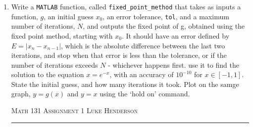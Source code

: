 \documentclass[12pt]{amsart}
\begin{document}
\begin{enumerate}
\begin{enumerate}
\begin{enumerate}
        \item\begin{multicols}{2}
            
        \columnbreak
            
        \end{multicols}
        The number computed with the Python solver is approximately 0.43857, whereas the one computed with the bisection method is approximately 0.43856. I am not sure precisely which of the \href{https://docs.scipy.org/doc/scipy/reference/generated/scipy.optimize.root_scalar.html}{available solvers} in SciPy is used by default, but it is likely not the bisection method and instead a method that converges faster. That combined with the fact that there is no maximum iteration number by default means that the SciPy answer is likely closer to the answer. The fact that they vary by about $10^{-5}$ supports the idea that the early termination in \texttt{bisection\_method} contributes to the discrepancy, since that is the least upper bound for absolute error bound that was chosen.
    \end{enumerate}
\end{enumerate}
\bigskip

\item Write a \texttt{MATLAB} function, called \texttt{fixed\_point\_method} that takes as inputs a function, $g$, an initial guess $x_0$, an error tolerance, \texttt{tol}, and a maximum number of iterations, $N$, and outputs the fixed point of g, obtained using the fixed point method, starting with $x_0$. It should have an error defined by $E = |x_n - x_{n-1}|$, which is the absolute difference between the last two iterations, and stop when that error is less than the tolerance, or if the number of iterations exceeds $N$ - whichever happens first. use it to find the solution to the equation $x = e^{-x}$, with an accuracy of $10^{-10}$ for $x \in [-1, 1]$. State the initial guess, and how many iterations it took. Plot on the samge graph, $y = g(x)$ and $y = x$ using the `hold on' command.

\newpage
{\scshape Math 131} \hfill {\scshape \large Assignment 1} \hfill {\scshape Luke Henderson}
\smallskip
\hrule
\bigskip

\begin{multicols}{2}
    
\columnbreak
    
\end{multicols}


\end{enumerate}
\end{document}
